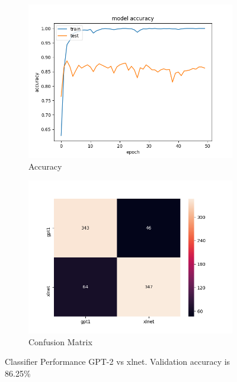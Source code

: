 \documentclass[11pt,letterpaper]{article}
\begin{document}
\begin{figure}[h!]
        \centering
        \begin{subfigure}[b]{1.0\linewidth}
                \centering
                \includegraphics[width=0.7\linewidth]{accuracy_epochs_gpt2_xlnet.png}
                \caption{Accuracy}
        \end{subfigure}
        \begin{subfigure}[b]{1.0\linewidth}
                \centering
                \includegraphics[width=0.7\linewidth]{sns_heatmap_gpt2_xlnet.png}
                \caption{Confusion Matrix}
        \end{subfigure}
        \caption{Classifier Performance GPT-2 vs xlnet. Validation accuracy is 86.25\%}
        \label{fig:prob6.3}
\end{figure}
\end{document}
